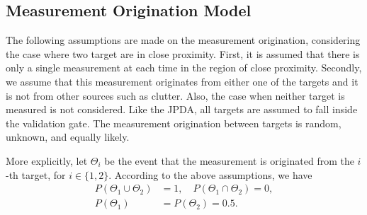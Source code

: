\documentclass[letterpaper, 10pt, conference]{ieeeconf}
\newcommand{\EditTL}[1]{{\color{red}\protect #1}}
\begin{document}

\subsection{Measurement Origination Model}
\label{DAP}


The following assumptions are made on the measurement origination, considering the case where two target are in close proximity. First, it is assumed that there is only a single measurement at each time in the region of close proximity. Secondly, we assume that this measurement originates from either one of the targets and it is not from other sources such as clutter. Also, the case when neither target is measured is not considered. Like the JPDA, all targets are assumed to fall inside the validation gate. The measurement origination between targets is random, unknown, and equally likely. 

More explicitly, let $\Theta_i$ be the event that the measurement is originated from the $i$-th target, for $i\in\{1,2\}$. According to the above assumptions, we have
\begin{align}
P(\Theta_1\cup \Theta_2)&=1,\quad
P(\Theta_1\cap \Theta_2)=0,\\
P(\Theta_1)&=P(\Theta_2)=0.5.\label{eqn:MeaOrig}
\end{align}

%
\end{document}
